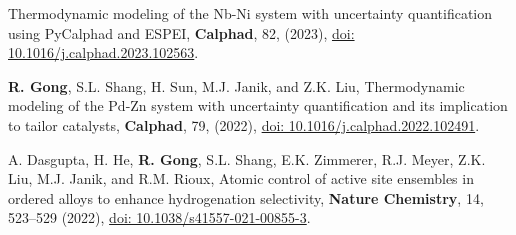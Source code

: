 \begin{etaremune}
Thermodynamic modeling of the Nb-Ni system with uncertainty quantification using PyCalphad and ESPEI, 
\textbf{Calphad}, 82, (2023),
\href{https://doi.org/10.1016/j.calphad.2023.102563}{doi: 10.1016/j.calphad.2023.102563}.
\item \textbf{R. Gong}, S.L. Shang, H. Sun, M.J. Janik, and Z.K. Liu,
Thermodynamic modeling of the Pd-Zn system with uncertainty quantification and its implication to tailor catalysts, 
\textbf{Calphad}, 79, (2022),
\href{https://doi.org/10.1016/j.calphad.2022.102491}{doi: 10.1016/j.calphad.2022.102491}.
\item  A. Dasgupta, H. He, \textbf{R. Gong}, S.L. Shang, E.K. Zimmerer, R.J. Meyer, Z.K. Liu, M.J. Janik, and R.M. Rioux,
Atomic control of active site ensembles in ordered alloys to enhance hydrogenation selectivity, 
\textbf{Nature Chemistry}, 14, 523–529 (2022),
\href{https://doi.org/10.1038/s41557-021-00855-3}{doi: 10.1038/s41557-021-00855-3}.

\end{etaremune}
